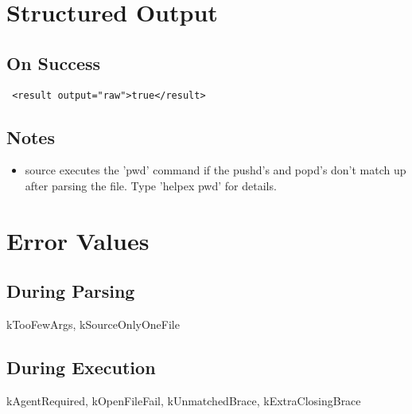 \documentclass[10pt]{article}
\begin{document}
\section*{ Structured Output }
\subsection*{ On Success }
\begin{verbatim}
 <result output="raw">true</result>

\end{verbatim}
\subsection*{ Notes }
\begin{itemize}
\item  source executes the 'pwd' command if the pushd's and popd's don't match up after parsing the file. Type 'helpex pwd' for details. 

\end{itemize}
\section*{ Error Values }
\subsection*{ During Parsing }


 kTooFewArgs, kSourceOnlyOneFile
\subsection*{ During Execution }


 kAgentRequired, kOpenFileFail, kUnmatchedBrace, kExtraClosingBrace
\end{document}
